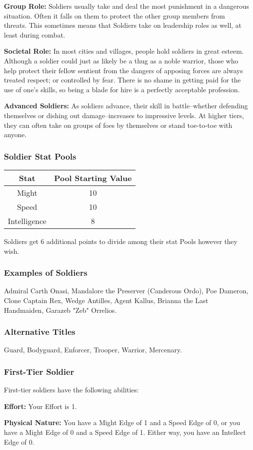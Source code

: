 \documentclass[a4paper,10pt,final,twocolumn,oneside]{book}
\newcommand{\statPool}[5]
{
	\subsubsection*{#1 Stat Pools}
	\label{subsub:#1StatPools}
	\begin{center}
	\begin{tabular}{ |c|c| }
	\hline
	\textbf{Stat} & \textbf{Pool Starting Value} \\
	\hline \hline
	Might & #2 \\
	\hline
 	Speed & #3  \\
 	\hline
 	Intelligence & #4  \\
 	\hline
	\end{tabular}
	\end{center}
	#1s get #5 additional points to divide among their stat Pools however they wish.
}
\newcommand{\itemLine}[2]{\textbf{#1:}{ #2}\par}
\begin{document}
\itemLine{Group Role}{Soldiers usually take and deal the most punishment in a dangerous situation. Often it falls on them to protect the other group members from threats. This sometimes means that Soldiers take on leadership roles as well, at least during combat.}

\itemLine{Societal Role}{In most cities and villages, people hold soldiers in great esteem. Although a soldier could just as likely be a thug as a noble warrior, those who help protect their fellow sentient from the dangers of apposing forces are always treated respect; or controlled by fear. There is no shame in getting paid for the use of one’s skills, so being a blade for hire is a perfectly acceptable profession.}

\itemLine{Advanced Soldiers}{As soldiers advance, their skill in battle--whether defending themselves or dishing out damage--increases to impressive levels. At higher tiers, they can often take on groups of foes by themselves or stand toe-to-toe with anyone.}

\statPool{Soldier}{10}{10}{8}{6}

\subsubsection*{Examples of Soldiers}
\label{subsub:soldierExamples}

Admiral Carth Onasi, Mandalore the Preserver (Canderous Ordo), Poe Dameron, Clone Captain Rex, Wedge Antilles, Agent Kallus, Brianna the Last Handmaiden, Garazeb "Zeb" Orrelios.

\subsubsection*{Alternative Titles}
\label{subsub:soldierAlternative}

Guard, Bodyguard, Enforcer, Trooper, Warrior, Mercenary.


\subsubsection*{First-Tier Soldier}
\label{subsub:soldierFirstTier}

First-tier soldiers have the following abilities:

\itemLine{Effort}{Your Effort is 1.}

\itemLine{Physical Nature}{You have a Might Edge
of 1 and a Speed Edge of 0, or you have a
Might Edge of 0 and a Speed Edge of 1.
Either way, you have an Intellect Edge of 0.}
\end{document}

